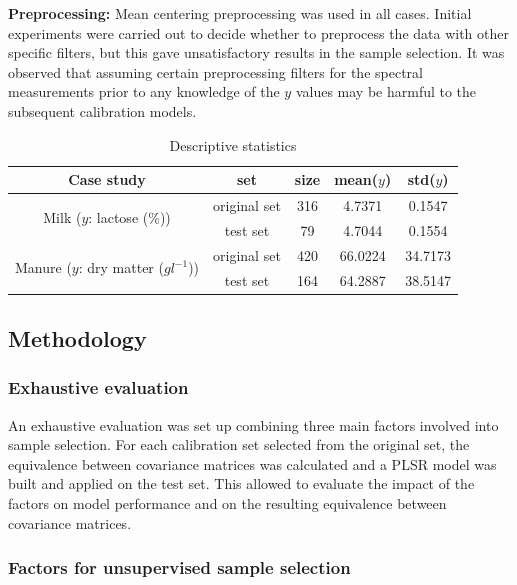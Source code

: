 \documentclass[journal=ancham,manuscript=article]{achemso}
\begin{document}
\textbf{Preprocessing:} Mean centering preprocessing was used in all cases. Initial experiments were carried out to decide whether to preprocess the data with other specific filters, but this gave unsatisfactory results in the sample selection. It was observed that assuming certain preprocessing filters for the spectral measurements prior to any knowledge of the $y$ values may be harmful to the subsequent calibration models. 

\begin{table}[t]
\centering
\begin{tabular}{|c|c|c|c|c|} 
\hline
Case study	& set & size & mean($y$) & std($y$)  	\\
\hline
\multirow{2}{10em}{Milk ($y$: lactose (\%))} & original set & 316 & 4.7371 & 0.1547\\
& test set & 79 & 4.7044 & 0.1554\\
\hline
\multirow{2}{10em}{Manure ($y$: dry matter ($gl^{-1}$))} & original set & 420 & 66.0224 & 34.7173\\
& test set & 164 & 64.2887 & 38.5147 \\
\hline 


\end{tabular}
\caption{Descriptive statistics}
\label{tab_descriptive_statistics}
\end{table}

\subsection{Methodology}\label{methodology}

\subsubsection{Exhaustive evaluation}

An exhaustive evaluation was set up combining three main factors involved into sample selection. For each calibration set selected from the original set, the equivalence between covariance matrices was calculated and a PLSR model was built and applied on the test set. This allowed to evaluate the impact of the factors on model performance and on the resulting equivalence between covariance matrices. 


\subsubsection{Factors for unsupervised sample selection}
\end{document}
